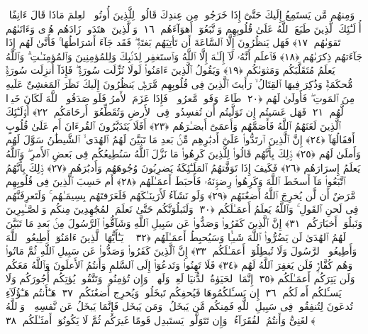  وَمِنهُم مَّن يَستَمِعُ إِلَيكَ حَتَّىٰٓ إِذَا خَرَجُوا۟ مِن عِندِكَ قَالُوا۟ لِلَّذِينَ أُوتُوا۟ ٱلعِلمَ مَاذَا قَالَ ءَانِفًا ۚ أُو۟لَـٰٓئِكَ ٱلَّذِينَ طَبَعَ ٱللَّهُ عَلَىٰ قُلُوبِهِم وَٱتَّبَعُوٓا۟ أَهوَآءَهُم ﴿١٦﴾
 وَٱلَّذِينَ ٱهتَدَوا۟ زَادَهُم هُدًۭى وَءَاتَىٰهُم تَقوَىٰهُم ﴿١٧﴾
 فَهَل يَنظُرُونَ إِلَّا ٱلسَّاعَةَ أَن تَأتِيَهُم بَغتَةًۭ ۖ فَقَد جَآءَ أَشرَاطُهَا ۚ فَأَنَّىٰ لَهُم إِذَا جَآءَتهُم ذِكرَىٰهُم ﴿١٨﴾
 فَٱعلَم أَنَّهُۥ لَآ إِلَـٰهَ إِلَّا ٱللَّهُ وَٱستَغفِر لِذَنۢبِكَ وَلِلمُؤمِنِينَ وَٱلمُؤمِنَـٰتِ ۗ وَٱللَّهُ يَعلَمُ مُتَقَلَّبَكُم وَمَثوَىٰكُم ﴿١٩﴾
 وَيَقُولُ ٱلَّذِينَ ءَامَنُوا۟ لَولَا نُزِّلَت سُورَةٌۭ ۖ فَإِذَآ أُنزِلَت سُورَةٌۭ مُّحكَمَةٌۭ وَذُكِرَ فِيهَا ٱلقِتَالُ ۙ رَأَيتَ ٱلَّذِينَ فِى قُلُوبِهِم مَّرَضٌۭ يَنظُرُونَ إِلَيكَ نَظَرَ ٱلمَغشِىِّ عَلَيهِ مِنَ ٱلمَوتِ ۖ فَأَولَىٰ لَهُم ﴿٢٠﴾
 طَاعَةٌۭ وَقَولٌۭ مَّعرُوفٌۭ ۚ فَإِذَا عَزَمَ ٱلأَمرُ فَلَو صَدَقُوا۟ ٱللَّهَ لَكَانَ خَيرًۭا لَّهُم ﴿٢١﴾
 فَهَل عَسَيتُم إِن تَوَلَّيتُم أَن تُفسِدُوا۟ فِى ٱلأَرضِ وَتُقَطِّعُوٓا۟ أَرحَامَكُم ﴿٢٢﴾
 أُو۟لَـٰٓئِكَ ٱلَّذِينَ لَعَنَهُمُ ٱللَّهُ فَأَصَمَّهُم وَأَعمَىٰٓ أَبصَـٰرَهُم ﴿٢٣﴾
 أَفَلَا يَتَدَبَّرُونَ ٱلقُرءَانَ أَم عَلَىٰ قُلُوبٍ أَقفَالُهَآ ﴿٢٤﴾
 إِنَّ ٱلَّذِينَ ٱرتَدُّوا۟ عَلَىٰٓ أَدبَٰرِهِم مِّنۢ بَعدِ مَا تَبَيَّنَ لَهُمُ ٱلهُدَى ۙ ٱلشَّيطَٰنُ سَوَّلَ لَهُم وَأَملَىٰ لَهُم ﴿٢٥﴾
 ذَٟلِكَ بِأَنَّهُم قَالُوا۟ لِلَّذِينَ كَرِهُوا۟ مَا نَزَّلَ ٱللَّهُ سَنُطِيعُكُم فِى بَعضِ ٱلأَمرِ ۖ وَٱللَّهُ يَعلَمُ إِسرَارَهُم ﴿٢٦﴾
 فَكَيفَ إِذَا تَوَفَّتهُمُ ٱلمَلَـٰٓئِكَةُ يَضرِبُونَ وُجُوهَهُم وَأَدبَٰرَهُم ﴿٢٧﴾
 ذَٟلِكَ بِأَنَّهُمُ ٱتَّبَعُوا۟ مَآ أَسخَطَ ٱللَّهَ وَكَرِهُوا۟ رِضوَٟنَهُۥ فَأَحبَطَ أَعمَـٰلَهُم ﴿٢٨﴾
 أَم حَسِبَ ٱلَّذِينَ فِى قُلُوبِهِم مَّرَضٌ أَن لَّن يُخرِجَ ٱللَّهُ أَضغَٰنَهُم ﴿٢٩﴾
 وَلَو نَشَآءُ لَأَرَينَـٰكَهُم فَلَعَرَفتَهُم بِسِيمَـٰهُم ۚ وَلَتَعرِفَنَّهُم فِى لَحنِ ٱلقَولِ ۚ وَٱللَّهُ يَعلَمُ أَعمَـٰلَكُم ﴿٣٠﴾
 وَلَنَبلُوَنَّكُم حَتَّىٰ نَعلَمَ ٱلمُجَٰهِدِينَ مِنكُم وَٱلصَّـٰبِرِينَ وَنَبلُوَا۟ أَخبَارَكُم ﴿٣١﴾
 إِنَّ ٱلَّذِينَ كَفَرُوا۟ وَصَدُّوا۟ عَن سَبِيلِ ٱللَّهِ وَشَآقُّوا۟ ٱلرَّسُولَ مِنۢ بَعدِ مَا تَبَيَّنَ لَهُمُ ٱلهُدَىٰ لَن يَضُرُّوا۟ ٱللَّهَ شَيـًۭٔا وَسَيُحبِطُ أَعمَـٰلَهُم ﴿٣٢﴾
 ۞ يَـٰٓأَيُّهَا ٱلَّذِينَ ءَامَنُوٓا۟ أَطِيعُوا۟ ٱللَّهَ وَأَطِيعُوا۟ ٱلرَّسُولَ وَلَا تُبطِلُوٓا۟ أَعمَـٰلَكُم ﴿٣٣﴾
 إِنَّ ٱلَّذِينَ كَفَرُوا۟ وَصَدُّوا۟ عَن سَبِيلِ ٱللَّهِ ثُمَّ مَاتُوا۟ وَهُم كُفَّارٌۭ فَلَن يَغفِرَ ٱللَّهُ لَهُم ﴿٣٤﴾
 فَلَا تَهِنُوا۟ وَتَدعُوٓا۟ إِلَى ٱلسَّلمِ وَأَنتُمُ ٱلأَعلَونَ وَٱللَّهُ مَعَكُم وَلَن يَتِرَكُم أَعمَـٰلَكُم ﴿٣٥﴾
 إِنَّمَا ٱلحَيَوٰةُ ٱلدُّنيَا لَعِبٌۭ وَلَهوٌۭ ۚ وَإِن تُؤمِنُوا۟ وَتَتَّقُوا۟ يُؤتِكُم أُجُورَكُم وَلَا يَسـَٔلكُم أَموَٟلَكُم ﴿٣٦﴾
 إِن يَسـَٔلكُمُوهَا فَيُحفِكُم تَبخَلُوا۟ وَيُخرِج أَضغَٰنَكُم ﴿٣٧﴾
 هَـٰٓأَنتُم هَـٰٓؤُلَآءِ تُدعَونَ لِتُنفِقُوا۟ فِى سَبِيلِ ٱللَّهِ فَمِنكُم مَّن يَبخَلُ ۖ وَمَن يَبخَل فَإِنَّمَا يَبخَلُ عَن نَّفسِهِۦ ۚ وَٱللَّهُ ٱلغَنِىُّ وَأَنتُمُ ٱلفُقَرَآءُ ۚ وَإِن تَتَوَلَّوا۟ يَستَبدِل قَومًا غَيرَكُم ثُمَّ لَا يَكُونُوٓا۟ أَمثَـٰلَكُم ﴿٣٨﴾
 
